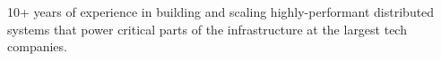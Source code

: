 \documentclass[9pt]{developercv} %
\begin{document}
\vspace{0.5cm}



\begin{minipage}[t]{0.4\textwidth} %
	\vspace{-\baselineskip} %
	
	10+ years of experience in building and scaling highly-performant distributed systems that power critical parts of the infrastructure at the largest tech companies.
\end{minipage}
\hfill %
\begin{minipage}[t]{0.5\textwidth} %
	\vspace{-\baselineskip} %
	\begin{barchart}{5.5}
	\end{barchart}
\end{minipage}


\end{document}
